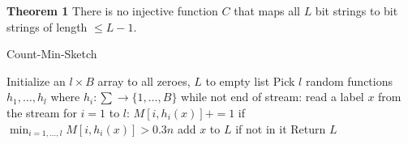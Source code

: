 \documentclass{article}
\begin{document}
\begin{multicols}{2}
\textbf{Theorem 1} There is no injective function $C$ that maps all $L$ bit strings to bit strings of length $\leq L - 1$. \\
\setlength{\textfloatsep}{0.1cm}
\begin{algorithm}[H]
\label{alg:quad}
\caption{Count-Min-Sketch}\label{euclid}
\begin{algorithmic}[1]
\State Initialize an $l \times B$ array to all zeroes, $L$ to empty list 
\State Pick $l$ random functions $h_1, \ldots, h_l$ where $h_i: \sum \rightarrow \{1, \ldots, B\}$
\State while not end of stream: 
\Indent 
\State read a label $x$ from the stream
\State for $i= 1$ to $l$: 
\Indent 
\State $M[i, h_i(x)] += 1$
\EndIndent
\State if $\min_{i=1,\ldots,l} M[i, h_i(x)] > 0.3n$ add $x$ to $L$ if not in it 
\EndIndent
\State Return $L$
\end{algorithmic}
\end{algorithm}
\setlength{\floatsep}{0.0cm} 

\end{multicols}
\end{document}

